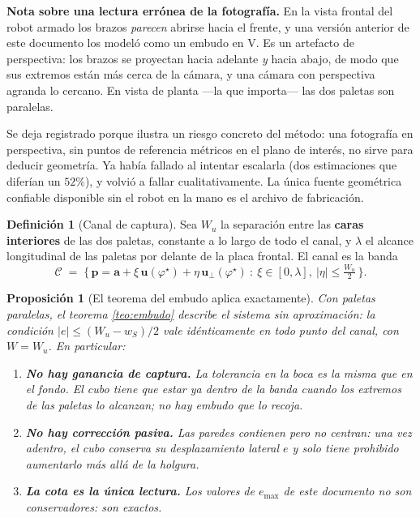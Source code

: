 \documentclass[11pt,a4paper]{article}
\newtheorem{proposicion}[teorema]{Proposición}
\theoremstyle{definition}
\newtheorem{definicion}[teorema]{Definición}
\newcommand{\uu}{\mathbf{u}}
\newcommand{\pp}{\mathbf{p}}
\newcommand{\aaa}{\mathbf{a}}
\begin{document}
\begin{tcolorbox}[colback=black!5,colframe=black!65,boxrule=0.7pt,arc=1pt]
\textbf{Nota sobre una lectura errónea de la fotografía.} En la vista frontal del robot
armado los brazos \emph{parecen} abrirse hacia el frente, y una versión anterior de este
documento los modeló como un embudo en V. Es un artefacto de perspectiva: los brazos se
proyectan hacia adelante \emph{y} hacia abajo, de modo que sus extremos están más cerca
de la cámara, y una cámara con perspectiva agranda lo cercano. En vista de planta ---la
que importa--- las dos paletas son paralelas.

Se deja registrado porque ilustra un riesgo concreto del método: una fotografía en
perspectiva, sin puntos de referencia métricos en el plano de interés, no sirve para
deducir geometría. Ya había fallado al intentar escalarla (dos estimaciones que diferían
un $52\%$), y volvió a fallar cualitativamente. La única fuente geométrica confiable
disponible sin el robot en la mano es el archivo de fabricación.
\end{tcolorbox}

\begin{definicion}[Canal de captura]
Sea $W_u$ la separación entre las \textbf{caras interiores} de las dos paletas, constante
a lo largo de todo el canal, y $\lambda$ el alcance longitudinal de las paletas por
delante de la placa frontal. El canal es la banda
\[
  \mathcal{C} \;=\; \Big\{\, \pp = \aaa + \xi\,\uu(\varphi^\star) + \eta\,\uu_\perp(\varphi^\star)
  \ :\ \xi \in [0,\lambda],\ |\eta| \le \tfrac{W_u}{2} \,\Big\}.
\]
\end{definicion}

\begin{proposicion}[El teorema del embudo aplica exactamente]
\label{prop:canal}
Con paletas paralelas, el teorema \ref{teo:embudo} describe el sistema \emph{sin
aproximación}: la condición $|e| \le (W_u - w_S)/2$ vale idénticamente en todo punto del
canal, con $W = W_u$. En particular:
\begin{enumerate}[label=(\alph*),leftmargin=2.2em,itemsep=2pt]
\item \textbf{No hay ganancia de captura.} La tolerancia en la boca es la misma que en el
      fondo. El cubo tiene que estar ya dentro de la banda cuando los extremos de las
      paletas lo alcanzan; no hay embudo que lo recoja.
\item \textbf{No hay corrección pasiva.} Las paredes \emph{contienen} pero no
      \emph{centran}: una vez adentro, el cubo conserva su desplazamiento lateral $e$ y
      solo tiene prohibido aumentarlo más allá de la holgura.
\item \textbf{La cota es la única lectura.} Los valores de $e_{\max}$ de este documento
      no son conservadores: son exactos.
\end{enumerate}
\end{proposicion}
\end{document}
